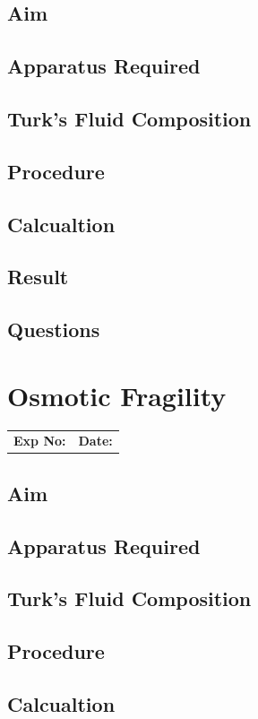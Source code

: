 \documentclass[a4paper,12pt]{book}
\begin{document}
					\section*{Aim}
					\section*{Apparatus Required}
					\section*{Turk's Fluid Composition}
					\section*{Procedure}
					\section*{Calcualtion}
					\section*{Result}
					\section*{Questions}


					\chapter*{\centering Osmotic Fragility}
					\begin{tabular}{p{5in} p{1in}}
						\textbf{Exp No:}  & \textbf{Date:}\\
					\end{tabular}

					\section*{Aim}
					\section*{Apparatus Required}
					\section*{Turk's Fluid Composition}
					\section*{Procedure}
					\section*{Calcualtion}
\end{document}
